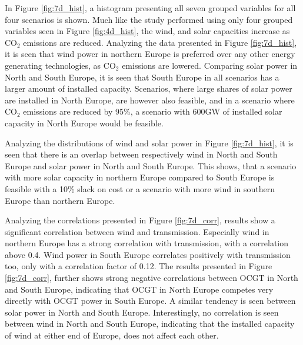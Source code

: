 In Figure \ref{fig:7d_hist}, a histogram presenting all seven grouped variables for all four scenarios is shown. Much like the study performed using only four grouped variables seen in Figure \ref{fig:4d_hist}, the wind, and solar capacities increase as $\text{CO}_2$ emissions are reduced.  
Analyzing the data presented in Figure \ref{fig:7d_hist}, it is seen that wind power in northern Europe is preferred over any other energy generating technologies, as $\text{CO}_2$ emissions are lowered. Comparing solar power in North and South Europe, it is seen that South Europe in all scenarios has a larger amount of installed capacity. Scenarios, where large shares of solar power are installed in North Europe, are however also feasible, and in a scenario where $\text{CO}_2$ emissions are reduced by 95\%, a scenario with 600GW of installed solar capacity in North Europe would be feasible. 

Analyzing the distributions of wind and solar power in Figure \ref{fig:7d_hist}, it is seen that there is an overlap between respectively wind in North and South Europe and solar power in North and South Europe. This shows, that a scenario with more solar capacity in northern Europe compared to South Europe is feasible with a 10\% slack on cost or a scenario with more wind in southern Europe than northern Europe. 

Analyzing the correlations presented in Figure \ref{fig:7d_corr}, results show a significant correlation between wind and transmission. Especially wind in northern Europe has a strong correlation with transmission, with a correlation above 0.4. Wind power in South Europe correlates positively with transmission too, only with a correlation factor of 0.12. 
The results presented in Figure \ref{fig:7d_corr}, further shows strong negative correlations between OCGT in North and South Europe, indicating that OCGT in North Europe competes very directly with OCGT power in South Europe. A similar tendency is seen between solar power in North and South Europe. Interestingly, no correlation is seen between wind in North and South Europe, indicating that the installed capacity of wind at either end of Europe, does not affect each other. 

